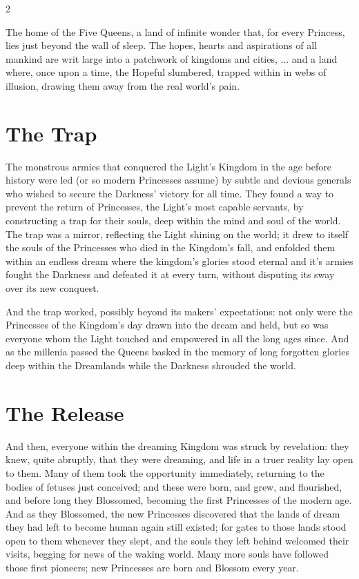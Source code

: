 
\label{cha:Dreamlands}


\begin{multicols}{2}\raggedcolumns

The home of the Five Queens, a land of infinite wonder that, for every Princess, lies just beyond the wall of sleep. The hopes, hearts and aspirations of all mankind are writ large into a patchwork of kingdoms and cities, ... and a land where, once upon a time, the Hopeful slumbered, trapped within in webs of illusion, drawing them away from the real world's pain.

\section*{The Trap}

The monstrous armies that conquered the Light's Kingdom in the age before history were led (or so modern Princesses assume) by subtle and devious generals who wished to secure the Darkness' victory for all time.  They found a way to prevent the return of Princesses, the Light's most capable servants, by constructing a trap for their souls, deep within the mind and soul of the world.  The trap was a mirror, reflecting the Light shining on the world; it drew to itself the souls of the Princesses who died in the Kingdom's fall, and enfolded them within an endless dream where the kingdom's glories stood eternal and it's armies fought the Darkness and defeated it at every turn, without disputing its sway over its new conquest.

And the trap worked, possibly beyond its makers' expectations: not only were the Princesses of the Kingdom's day drawn into the dream and held, but so was everyone whom the Light touched and empowered in all the long ages since.  And as the millenia passed the Queens basked in the memory of long forgotten glories deep within the Dreamlands while the Darkness shrouded the world.

\section*{The Release}

And then, everyone within the dreaming Kingdom was struck by revelation: they knew, quite abruptly, that they were dreaming, and life in a truer reality lay open to them.  Many of them took the opportunity immediately, returning to the bodies of fetuses just conceived; and these were born, and grew, and flourished, and before long they Blossomed, becoming the first Princesses of the modern age.  And as they Blossomed, the new Princesses discovered that the lands of dream they had left to become human again still existed; for gates to those lands stood open to them whenever they slept, and the souls they left behind welcomed their visits, begging for news of the waking world.  Many more souls have followed those first pioneers; new Princesses are born and Blossom every year.


\end{multicols}
